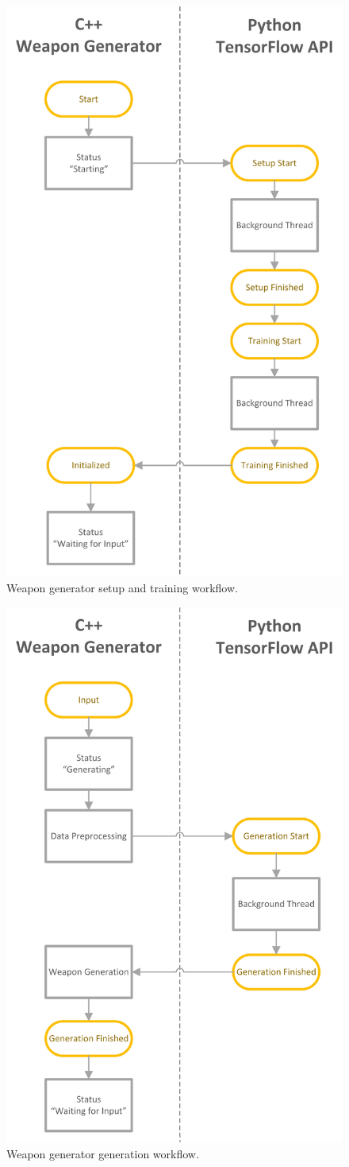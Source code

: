 \documentclass[MGS,Master,english]{twbook}%
\begin{document}
\begin{figure}[!htbp]
	\centering
	\includegraphics[width=0.5\linewidth]{PICs/WeaponGeneratorWorkflow_Setup_Training}
	\caption{Weapon generator setup and training workflow.}
\end{figure}

\begin{figure}[!htbp]
	\centering
	\includegraphics[width=0.5\linewidth]{PICs/WeaponGeneratorWorkflow_Generation}
	\caption{Weapon generator generation workflow.}
\end{figure}
\end{document}
